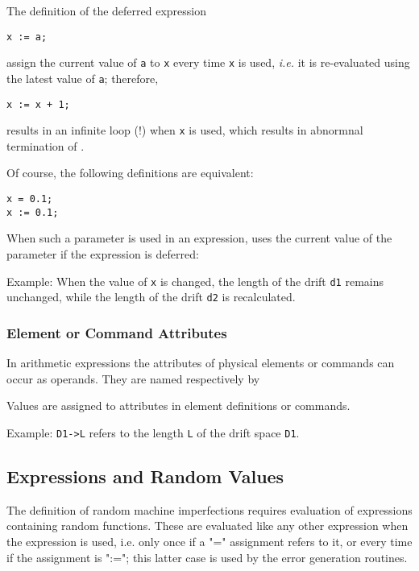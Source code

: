 The definition of the deferred expression  
\begin{verbatim}
x := a;
\end{verbatim} 
assign the current value of \texttt{a} to \texttt{x} every time
\texttt{x} is used, \textsl{i.e.} it is re-evaluated using the latest
value of \texttt{a}; therefore,   
\begin{verbatim}
x := x + 1;
\end{verbatim} 
results in an infinite loop (!) when \texttt{x} is used, which results
in abnormnal termination of \madx. 

Of course, the following definitions are equivalent:  
\begin{verbatim}
x = 0.1;
x := 0.1;
\end{verbatim}

When such a parameter is used in an expression, \madx uses the current
value of the parameter if the expression is deferred:  

Example: 
When the value of \texttt{x} is changed, the length of the drift
\texttt{d1} remains unchanged, while the length of the drift \texttt{d2}
is recalculated.

\subsubsection{Element or Command Attributes} 
In arithmetic expressions the attributes of physical elements or
commands can occur as operands. They are named respectively by  

Values are assigned to attributes in element definitions or commands. 

Example: 
\texttt{D1-\textgreater L} refers to the length \texttt{L} of the drift
space \texttt{D1}.   

\subsection{Expressions and Random Values}
\label{subsec:expr_rnd}
The definition of random machine imperfections requires evaluation of
expressions containing random functions. These are evaluated like any
other expression when the expression is used, i.e. only once if a "="
assignment refers to it, or every time if the assignment is ":="; this
latter case is used by the error generation routines.  


